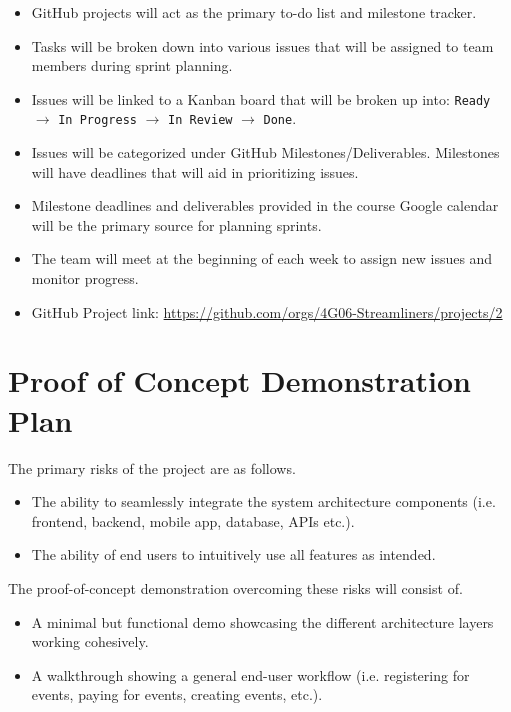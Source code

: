 \documentclass{article}
\begin{document}
\begin{itemize}
  \item GitHub projects will act as the primary to-do list and milestone tracker.
  \item Tasks will be broken down into various issues that will be assigned to team members during sprint planning.
  \item Issues will be linked to a Kanban board that will be broken up into: \texttt{Ready} $\rightarrow$ \texttt{In Progress} $\rightarrow$ \texttt{In Review} $\rightarrow$ \texttt{Done}.
  \item Issues will be categorized under GitHub Milestones/Deliverables. Milestones will have deadlines that will aid in prioritizing issues.
  \item Milestone deadlines and deliverables provided in the course Google calendar will be the primary source for planning sprints. 
  \item The team will meet at the beginning of each week to assign new issues and monitor progress.
  \item GitHub Project link:
  \url{https://github.com/orgs/4G06-Streamliners/projects/2}
\end{itemize}

\section{Proof of Concept Demonstration Plan}

The primary risks of the project are as follows.
\begin{itemize}
    \item The ability to seamlessly integrate the system architecture components (i.e. frontend, backend, mobile app, database, APIs etc.).
    \item The ability of end users to intuitively use all features as intended.
\end{itemize}

\noindent The proof-of-concept demonstration overcoming these risks will consist of.

\begin{itemize}
    \item A minimal but functional demo showcasing the different architecture layers working cohesively.
    \item A walkthrough showing a general end-user workflow (i.e. registering for events, paying for events, creating events, etc.).
\end{itemize}
\end{document}
